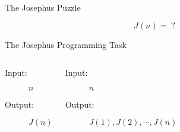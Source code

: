 \begin{frame}{The Josephus Puzzle}

  \pause
  \[
    J(n) = \; ?
  \]
\end{frame}

\begin{frame}{The Josephus Programming Task}

  \begin{columns}
      \begin{description}
	\item[Input:] $n$
	\item[Output:] $J(n)$
      \end{description}
      \begin{description}
	\item[Input:] $n$
	\item[Output:] $J(1), J(2), \cdots, J(n)$
      \end{description}
  \end{columns}
\end{frame}
